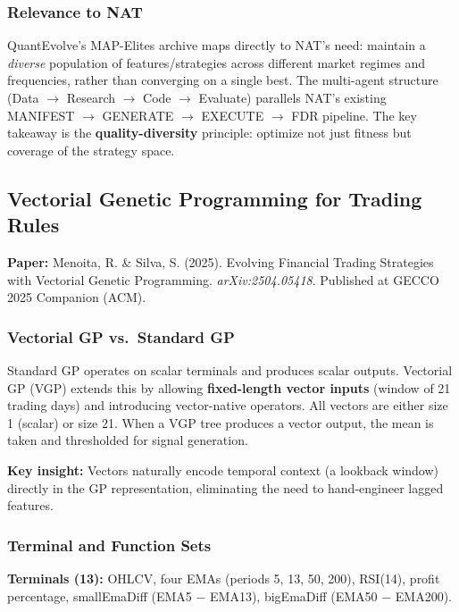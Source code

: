 \documentclass[11pt,a4paper]{article}
\begin{document}
\subsubsection{Relevance to NAT}

QuantEvolve's MAP-Elites archive maps directly to NAT's need: maintain a \textit{diverse} population of features/strategies across different market regimes and frequencies, rather than converging on a single best. The multi-agent structure (Data $\to$ Research $\to$ Code $\to$ Evaluate) parallels NAT's existing MANIFEST $\to$ GENERATE $\to$ EXECUTE $\to$ FDR pipeline. The key takeaway is the \textbf{quality-diversity} principle: optimize not just fitness but coverage of the strategy space.


\subsection{Vectorial Genetic Programming for Trading Rules}

\textbf{Paper:} Menoita, R. \& Silva, S. (2025). Evolving Financial Trading Strategies with Vectorial Genetic Programming. \textit{arXiv:2504.05418}. Published at GECCO 2025 Companion (ACM).

\subsubsection{Vectorial GP vs.\ Standard GP}

Standard GP operates on scalar terminals and produces scalar outputs. Vectorial GP (VGP) extends this by allowing \textbf{fixed-length vector inputs} (window of 21 trading days) and introducing vector-native operators. All vectors are either size 1 (scalar) or size 21. When a VGP tree produces a vector output, the mean is taken and thresholded for signal generation.

\textbf{Key insight:} Vectors naturally encode temporal context (a lookback window) directly in the GP representation, eliminating the need to hand-engineer lagged features.

\subsubsection{Terminal and Function Sets}

\textbf{Terminals (13):} OHLCV, four EMAs (periods 5, 13, 50, 200), RSI(14), profit percentage, smallEmaDiff (EMA5 $-$ EMA13), bigEmaDiff (EMA50 $-$ EMA200).
\end{document}

